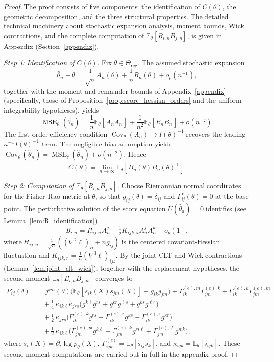 \documentclass[11pt,letterpaper]{amsart}
\newcommand{\E}{\mathbb{E}}
\DeclareMathOperator{\Cov}{Cov}
\numberwithin{equation}{section}
\theoremstyle{plain}
\theoremstyle{definition}
\theoremstyle{remark}
\begin{document}
\begin{proof}
The proof consists of five components: the identification of $C(\theta)$, the geometric decomposition, and the three structural properties. The detailed technical machinery about stochastic expansion analysis, moment bounds, Wick contractions, and the complete computation of $\E_\theta[B_{i,n}B_{j,n}]$, is given in Appendix (Section~\ref{appendix}).

\medskip
\noindent\textit{Step 1: Identification of \(C(\theta)\).}
Fix \(\theta\in\Theta_{\mathrm{reg}}\). The assumed stochastic expansion
\[
\hat\theta_n-\theta
=
\frac1{\sqrt n}A_n(\theta)+\frac1n B_n(\theta)+o_p(n^{-1}),
\]
together with the moment and remainder bounds of Appendix~\ref{appendix} (specifically, those of Proposition~\ref{prop:score_hessian_orders} and the uniform integrability hypotheses), yields
\[
\operatorname{MSE}_\theta(\hat\theta_n)
=
\frac1n\E_\theta[A_nA_n^\top]
+\frac1{n^2}\E_\theta[B_nB_n^\top]
+o(n^{-2}).
\]
The first-order efficiency condition \(\Cov_\theta(A_n)\to I(\theta)^{-1}\) recovers the leading \(n^{-1}I(\theta)^{-1}\)-term. The negligible bias assumption yields \(\operatorname{Cov}_\theta(\hat\theta_n)=\operatorname{MSE}_\theta(\hat\theta_n)+o(n^{-2})\). Hence
\[
C(\theta)=\lim_{n\to\infty}\E_\theta[B_n(\theta)B_n(\theta)^\top].
\]

\medskip
\noindent\textit{Step 2: Computation of \(\E_\theta[B_{i,n}B_{j,n}]\).}
Choose Riemannian normal coordinates for the Fisher--Rao metric at \(\theta\), so that \(g_{ij}(\theta)=\delta_{ij}\) and \(\Gamma^k_{ij}(\theta)=0\) at the base point. The perturbative solution of the score equation \(U(\hat\theta_n)=0\) identifies (see Lemma~\ref{lem:B_identification})
\[
B_{i,n}
=
H_{ij,n}A_n^j+\tfrac12 K_{ijk,n}A_n^jA_n^k+o_p(1),
\]
where \(H_{ij,n}=\frac1{\sqrt n}((\nabla^2\ell)_{ij}+ng_{ij})\) is the centered covariant-Hessian fluctuation and \(K_{ijk,n}=\frac1n(\nabla^3\ell)_{ijk}\). By the joint CLT and Wick contractions (Lemma~\ref{lem:joint_clt_wick}), together with the replacement hypotheses, the second moment \(\E_\theta[B_{i,n}B_{j,n}]\) converges to
\begin{align*}
P_{ij}(\theta)
&=
g^{km}(\theta)\Big(\E_\theta[s_{ik}(X)s_{jm}(X)]-g_{ik}g_{jm}\Big)
+\Gamma^{(e),m}_{ik}\Gamma^{(e),k}_{jm}
+\Gamma^{(e),k}_{ik}\Gamma^{(e),m}_{jm}
\\
&\quad
+\tfrac14\,\kappa_{ik\ell}\kappa_{jrs}
\Big(
g^{k\ell}g^{rs}+g^{kr}g^{\ell s}+g^{ks}g^{\ell r}
\Big)
\\
&\quad
+\tfrac12\,\kappa_{jrs}\Big(
\Gamma^{(e),k}_{ik}g^{rs}+\Gamma^{(e),r}_{ik}g^{ks}+\Gamma^{(e),s}_{ik}g^{kr}
\Big)
\\
&\quad
+\tfrac12\,\kappa_{ik\ell}\Big(
\Gamma^{(e),m}_{jm}g^{k\ell}+\Gamma^{(e),k}_{jm}g^{m\ell}+\Gamma^{(e),\ell}_{jm}g^{mk}
\Big),
\end{align*}
where \(s_i(X)=\partial_i\log p_\theta(X)\), \(\Gamma^{(e)}_{ijk}=\E_\theta[s_{ij}s_k]\), and \(\kappa_{ijk}=\E_\theta[s_{ijk}]\). These second-moment computations are carried out in full in the appendix proof.


\end{proof}
\end{document}
